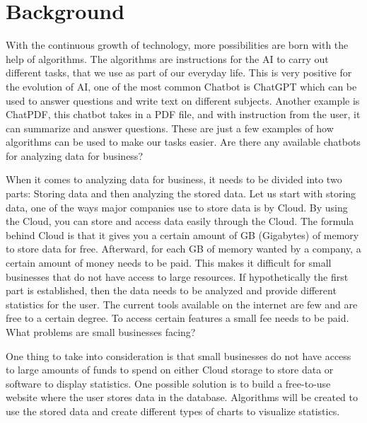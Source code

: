 \section{Background}
With the continuous growth of technology, more possibilities are born with the help of algorithms. The algorithms are instructions for the AI to carry out different tasks, that we use as part of our everyday life. This is very positive for the evolution of AI, one of the most common Chatbot is ChatGPT which can be used to answer questions and write text on different subjects. Another example is ChatPDF, this chatbot takes in a PDF file, and with instruction from the user, it can summarize and answer questions. These are just a few examples of how algorithms can be used to make our tasks easier. Are there any available chatbots for analyzing data for business?

\vspace{12pt}
When it comes to analyzing data for business, it needs to be divided into two parts: Storing data and then analyzing the stored data. Let us start with storing data, one of the ways major companies use to store data is by Cloud. By using the Cloud, you can store and access data easily through the Cloud.  The formula behind Cloud is that it gives you a certain amount of GB (Gigabytes) of memory to store data for free. Afterward, for each GB of memory wanted by a company, a certain amount of money needs to be paid. This makes it difficult for small businesses that do not have access to large resources. If hypothetically the first part is established, then the data needs to be analyzed and provide different statistics for the user. The current tools available on the internet are few and are free to a certain degree. To access certain features a small fee needs to be paid.  What problems are small businesses facing?

\vspace{12pt}
One thing to take into consideration is that small businesses do not have access to large amounts of funds to spend on either Cloud storage to store data or software to display statistics. One possible solution is to build a free-to-use website where the user stores data in the database. Algorithms will be created to use the stored data and create different types of charts to visualize statistics.